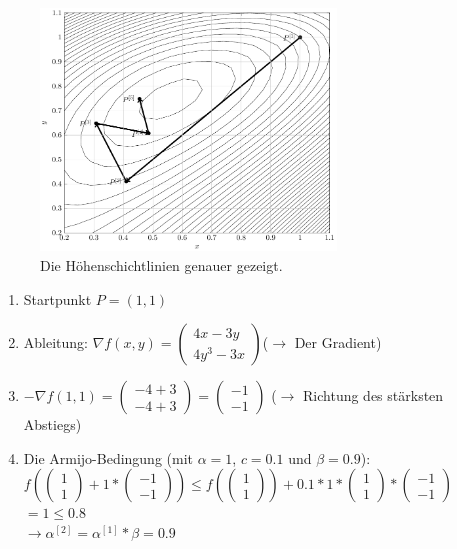 \documentclass[naustrian]{article}
\begin{document}
{\begin{figure}[H]
    \centering
    \includegraphics[width=0.7\textwidth]{grad/figure2}
    \caption{Die Höhenschichtlinien genauer gezeigt.}
\end{figure}

\begin{enumerate}
	\item
	Startpunkt $P=(1,1)$
	\item
	Ableitung: ${\nabla}f(x,y)=
	\left( \begin{array}{c}
	4x-3y \\
	4y^3-3x
	\end{array} \right)
	$($\rightarrow$ Der Gradient)
	\item
	$-{\nabla}f(1,1) =
	\left( \begin{array}{c}
	-4+3 \\
	-4+3
	\end{array} \right)
	=
	\left( \begin{array}{c}
	-1 \\
	-1
	\end{array} \right)
	$ ($\rightarrow$ Richtung des stärksten Abstiegs)
	\item
	Die Armijo-Bedingung (mit $\alpha = 1$, $c = 0.1$ und $\beta = 0.9$):\\
	$f( \left( \begin{array}{c} 1 \\ 1 \end{array} \right) + 1 * \left( \begin{array}{c} -1 \\ -1 \end{array} \right)) \leq f(\left( \begin{array}{c} 1 \\ 1 \end{array} \right)) + 0.1 * 1 *  \left( \begin{array}{c} 1 \\ 1 \end{array} \right) * \left( \begin{array}{c} -1 \\ -1 \end{array} \right)$ \\
	$= 1 \leq 0.8$ \\
	$\rightarrow \alpha^{[2]} = \alpha^{[1]} * \beta = 0.9$ \\


\end{enumerate}}
\end{document}
